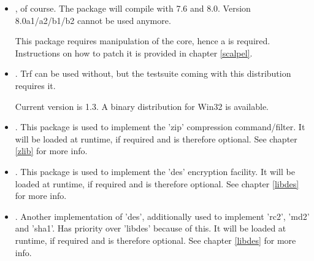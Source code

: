 \documentclass {report}
\begin{document}
\begin{itemize}
\item	\strong {\tcl}, of course. The package will compile with 7.6
	and 8.0. Version 8.0a1/a2/b1/b2 cannot be used anymore.

	This package requires manipulation of the core, hence a
	 is required. Instructions on how
	to patch it is provided in chapter \ref {scalpel}.

\item	{}. Trf can be used without, but the
	testsuite coming with this distribution requires it.

	Current version is 1.3. A binary distribution for Win32 is
	available.


	
\item	\strong {\zlib}. This package is used to implement the 'zip'
	compression command/filter. It will be loaded at runtime, if
	required and is therefore optional. See chapter \ref {zlib} for
	more info.

\item	{}. This package is used to implement the 'des'
	encryption facility. It will be loaded at runtime, if
	required and is therefore optional. See chapter \ref {libdes}
	for more info.

\item	\strong {\SSLeay}. Another implementation of 'des',
	additionally used to implement 'rc2', 'md2' and 'sha1'. Has
	priority over 'libdes' because of this. It will be loaded at
	runtime, if required and is therefore optional. See chapter
	\ref {libdes} for more info.
\end{itemize}
\end{document}
